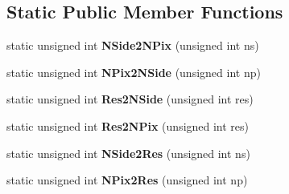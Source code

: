 \subsection*{Static Public Member Functions}
\begin{DoxyCompactItemize}
\item 
\hypertarget{classHealpixMap_a2346da1dc0fb99219cc01c13ecf0de57}{
static unsigned int {\bfseries NSide2NPix} (unsigned int ns)}
\label{classHealpixMap_a2346da1dc0fb99219cc01c13ecf0de57}

\item 
\hypertarget{classHealpixMap_a55f6da3fd679e30795e35c4bbcfebf2b}{
static unsigned int {\bfseries NPix2NSide} (unsigned int np)}
\label{classHealpixMap_a55f6da3fd679e30795e35c4bbcfebf2b}

\item 
\hypertarget{classHealpixMap_ae2b34ffae32ce2908ca0e275a5a7643d}{
static unsigned int {\bfseries Res2NSide} (unsigned int res)}
\label{classHealpixMap_ae2b34ffae32ce2908ca0e275a5a7643d}

\item 
\hypertarget{classHealpixMap_ac62c8c676ef547ce71a9e6f3ebb6656a}{
static unsigned int {\bfseries Res2NPix} (unsigned int res)}
\label{classHealpixMap_ac62c8c676ef547ce71a9e6f3ebb6656a}

\item 
\hypertarget{classHealpixMap_a18f012e362dbe9f95f6b63801d1b419d}{
static unsigned int {\bfseries NSide2Res} (unsigned int ns)}
\label{classHealpixMap_a18f012e362dbe9f95f6b63801d1b419d}

\item 
\hypertarget{classHealpixMap_a4b06594a76bef6c10c521f33df55bd0f}{
static unsigned int {\bfseries NPix2Res} (unsigned int np)}
\label{classHealpixMap_a4b06594a76bef6c10c521f33df55bd0f}

\end{DoxyCompactItemize}
